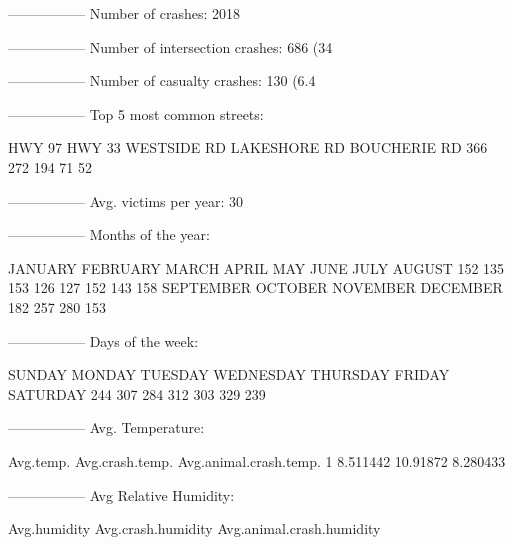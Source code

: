 \documentclass[11pt, a4paper]{article}
\begin{document}
\begin{Schunk}
\begin{Soutput}
-----------------
Number of crashes: 2018
\end{Soutput}
\begin{Soutput}
-----------------
Number of intersection crashes: 686 (34%
\end{Soutput}
\begin{Soutput}
-----------------
Number of casualty crashes: 130 (6.4%
\end{Soutput}
\begin{Soutput}
-----------------
Top 5 most common streets:
\end{Soutput}
\begin{Soutput}
      HWY 97       HWY 33  WESTSIDE RD LAKESHORE RD BOUCHERIE RD 
         366          272          194           71           52 
\end{Soutput}
\begin{Soutput}
-----------------
Avg. victims per year: 30
\end{Soutput}
\begin{Soutput}
-----------------
Months of the year:
\end{Soutput}
\begin{Soutput}
  JANUARY  FEBRUARY     MARCH     APRIL       MAY      JUNE      JULY    AUGUST 
      152       135       153       126       127       152       143       158 
SEPTEMBER   OCTOBER  NOVEMBER  DECEMBER 
      182       257       280       153 
\end{Soutput}
\begin{Soutput}
-----------------
Days of the week:
\end{Soutput}
\begin{Soutput}
   SUNDAY    MONDAY   TUESDAY WEDNESDAY  THURSDAY    FRIDAY  SATURDAY 
      244       307       284       312       303       329       239 
\end{Soutput}
\begin{Soutput}
-----------------
Avg. Temperature:
\end{Soutput}
\begin{Soutput}
  Avg.temp. Avg.crash.temp. Avg.animal.crash.temp.
1  8.511442        10.91872               8.280433
\end{Soutput}
\begin{Soutput}
-----------------
Avg Relative Humidity:
\end{Soutput}
\begin{Soutput}
  Avg.humidity Avg.crash.humidity Avg.animal.crash.humidity

\end{Soutput}
\end{Schunk}
\end{document}
